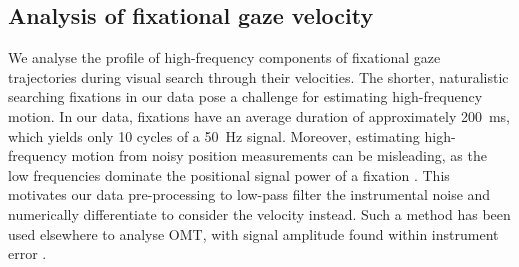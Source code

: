 \subsection{Analysis of fixational gaze velocity}
\label{subsec:fixational_spectra}
We analyse the profile of high-frequency components of fixational gaze trajectories during visual search through their velocities. The shorter, naturalistic searching fixations in our data pose a challenge for estimating high-frequency motion. In our data, fixations have an average duration of approximately \qty{200}{\milli\second}, which yields only 10 cycles of a \qty{50}{\hertz} signal. Moreover, estimating high-frequency motion from noisy position measurements can be misleading, as the low frequencies dominate the positional signal power of a fixation \cite{ko_eye_2016, ryle_simultaneous_2015}. This motivates our data pre-processing to low-pass filter the instrumental noise and numerically differentiate to consider the velocity instead. Such a method has been used elsewhere to analyse OMT, with signal amplitude found within instrument error \cite{ko_eye_2016}.

